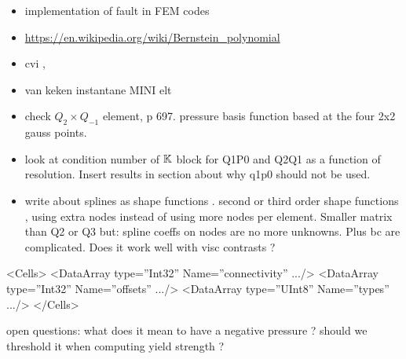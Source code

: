 \begin{itemize}
\item implementation of fault in FEM codes \cite{zhgu94,zhgu95}
\item \url{https://en.wikipedia.org/wiki/Bernstein_polynomial}
\item cvi \cite{pukp16},\cite{mcna11}
\item van keken instantane MINI elt
\item check $Q_2 \times Q_{-1}$ element, \cite{grsa} p 697. pressure basis function based at the four 2x2 gauss points.
\item look at condition number of ${\mathbb{K}}$ block for Q1P0 and Q2Q1 as a function of resolution. Insert results in section about why q1p0 should not be used. 
\item write about splines as shape functions \cite{chri92}. second or third order shape functions , using extra nodes instead of using more nodes per element. Smaller matrix than Q2 or Q3 but: spline coeffs on nodes are no more unknowns. Plus bc are complicated. Does it work well with visc contrasts ?

\end{itemize}

 <Cells>
      <DataArray type=”Int32” Name=”connectivity” .../>
      <DataArray type=”Int32” Name=”offsets” .../>
      <DataArray type=”UInt8” Name=”types” .../>
    </Cells>


open questions:
what does it mean to have a negative pressure ? should we threshold it when computing yield strength ? 
